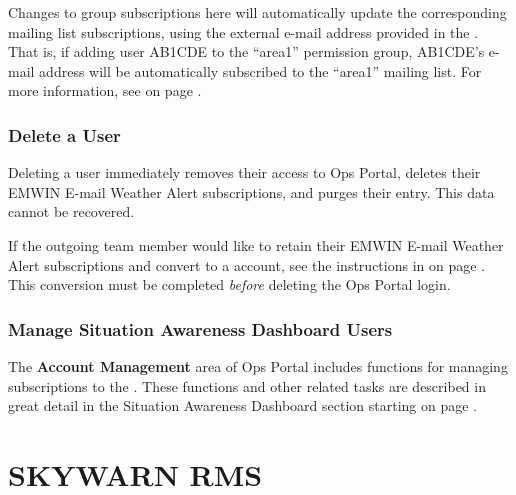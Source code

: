 \documentclass[pdflatex,letterpaper,twoside,12pt]{book}
\begin{document}
Changes to group subscriptions here will automatically update the corresponding mailing list subscriptions, using the external e-mail address provided in the .  That is, if adding user AB1CDE to the ``area1'' permission group, AB1CDE's e-mail address will be automatically subscribed to the ``area1'' mailing list.  For more information, see  on page \pageref{mailing-lists}.

\subsection{Delete a User}\label{ops-delete-user}

Deleting a user immediately removes their access to Ops Portal, deletes their EMWIN E-mail Weather Alert subscriptions, and purges their  entry.  This data cannot be recovered.

If the outgoing team member would like to retain their EMWIN E-mail Weather Alert subscriptions and convert to a  account, see the instructions in  on page \pageref{sit-account-conversion}.  This conversion must be completed \emph{before} deleting the Ops Portal login.

\subsection{Manage Situation Awareness Dashboard Users}\label{ops-manage-situation}

The \textbf{Account Management} area of Ops Portal includes functions for managing subscriptions to the .  These functions and other related tasks are described in great detail in the Situation Awareness Dashboard  section starting on page \pageref{sit-leadership-functions}.


\chapter{SKYWARN RMS}\label{rms}
\end{document}
